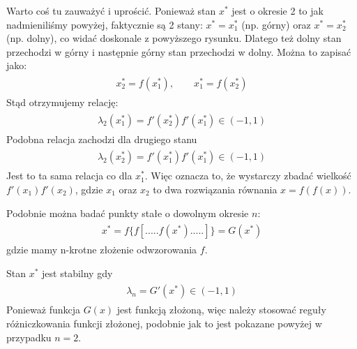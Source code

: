 \documentclass[a4paper,12pt,polish]{sphinxmanual}
\begin{document}
Warto coś tu zauważyć  i uprościć. Ponieważ stan $x^*$ jest o okresie 2 to jak nadmieniliśmy powyżej, faktycznie są 2 stany: $x^* = x^*_1$ (np. górny)  oraz $x^* = x^*_2$ (np. dolny), co widać doskonale z powyższego rysunku. Dlatego też dolny stan przechodzi w górny i następnie górny stan przechodzi w dolny. Można to zapisać jako:
\label{ch1/chI031:equation-eqn37}\begin{gather}
\begin{split}x_2^* = f(x_1^*), \qquad x_1^* = f(x_2^*)\end{split}\label{ch1/chI031-eqn37}
\end{gather}
Stąd otrzymujemy relację:
\label{ch1/chI031:equation-eqn38}\begin{gather}
\begin{split}  \lambda_2(x_1^*)  = f'(x^*_2) f'(x^*_1) \in (-1, 1)\end{split}\label{ch1/chI031-eqn38}
\end{gather}
Podobna relacja zachodzi dla drugiego stanu
\label{ch1/chI031:equation-eqn39}\begin{gather}
\begin{split}  \lambda_2(x_2^*)  = f'(x^*_1) f'(x^*_1) \in (-1, 1)\end{split}\label{ch1/chI031-eqn39}
\end{gather}
Jest to ta sama relacja co dla $x^*_1$. Więc oznacza to, że wystarczy zbadać wielkość $f'(x_1)f'(x_2)$, gdzie $x_1$  oraz  $x_2$ to dwa  rozwiązania równania $x=f(f(x))$.

Podobnie można badać  punkty stałe o dowolnym okresie $n$:
\label{ch1/chI031:equation-eqn40}\begin{gather}
\begin{split}x^*= f\{f[ .....f(x^*) .....]\}  = G(x^*)\end{split}\label{ch1/chI031-eqn40}
\end{gather}
gdzie mamy n-krotne złożenie odwzorowania $f$.

Stan  $x^*$  jest  stabilny gdy
\label{ch1/chI031:equation-eqn41}\begin{gather}
\begin{split}\lambda_n = G'(x^*) \in (-1, 1)\end{split}\label{ch1/chI031-eqn41}
\end{gather}
Ponieważ funkcja $G(x)$ jest funkcją złożoną, więc  należy stosować reguły różniczkowania  funkcji złożonej, podobnie jak to jest pokazane powyżej w przypadku $n=2$.
\end{document}
